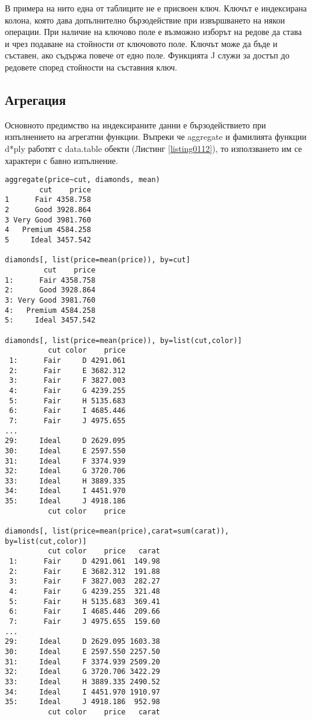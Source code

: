 В примера на нито една от таблиците не е присвоен ключ. Ключът е индексирана колона, която дава допълнително бързодействие при извършването на някои операции. При наличие на ключово поле е възможно изборът на редове да става и чрез подаване на стойности от ключовото поле. Ключът може да бъде и съставен, ако съдържа повече от едно поле. Функцията J служи за достъп до редовете според стойности на съставния ключ.

\subsection{Агрегация}

Основното предимство на индексираните данни е бързодействието при изпълнението на агрегатни функции. Въпреки че aggregate и фамилията функции d*ply работят с data.table обекти (Листинг \ref{listing0112}), то използването им се характери с бавно изпълнение.

\begin{lstlisting}[caption=Агрегатни функции, label=listing0112]
aggregate(price~cut, diamonds, mean)
        cut    price
1      Fair 4358.758
2      Good 3928.864
3 Very Good 3981.760
4   Premium 4584.258
5     Ideal 3457.542

diamonds[, list(price=mean(price)), by=cut]
         cut    price
1:      Fair 4358.758
2:      Good 3928.864
3: Very Good 3981.760
4:   Premium 4584.258
5:     Ideal 3457.542

diamonds[, list(price=mean(price)), by=list(cut,color)]
          cut color    price
 1:      Fair     D 4291.061
 2:      Fair     E 3682.312
 3:      Fair     F 3827.003
 4:      Fair     G 4239.255
 5:      Fair     H 5135.683
 6:      Fair     I 4685.446
 7:      Fair     J 4975.655
...
29:     Ideal     D 2629.095
30:     Ideal     E 2597.550
31:     Ideal     F 3374.939
32:     Ideal     G 3720.706
33:     Ideal     H 3889.335
34:     Ideal     I 4451.970
35:     Ideal     J 4918.186
          cut color    price

diamonds[, list(price=mean(price),carat=sum(carat)), by=list(cut,color)]
          cut color    price   carat
 1:      Fair     D 4291.061  149.98
 2:      Fair     E 3682.312  191.88
 3:      Fair     F 3827.003  282.27
 4:      Fair     G 4239.255  321.48
 5:      Fair     H 5135.683  369.41
 6:      Fair     I 4685.446  209.66
 7:      Fair     J 4975.655  159.60
...
29:     Ideal     D 2629.095 1603.38
30:     Ideal     E 2597.550 2257.50
31:     Ideal     F 3374.939 2509.20
32:     Ideal     G 3720.706 3422.29
33:     Ideal     H 3889.335 2490.52
34:     Ideal     I 4451.970 1910.97
35:     Ideal     J 4918.186  952.98
          cut color    price   carat
\end{lstlisting}

